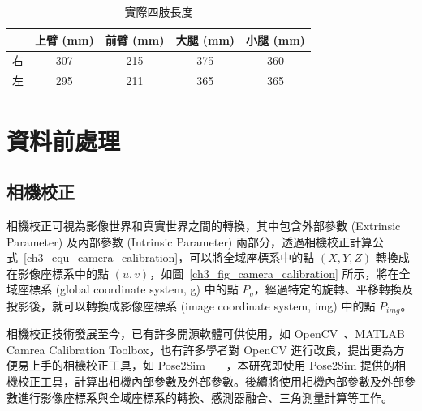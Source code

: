\begin{table}[!ht]
   \caption[實際四肢長度]{實際四肢長度}
   \centering
   \label{ch3_limb_length}
   \setlength{\tabcolsep}{3pt}
   \renewcommand\arraystretch{1.5}
   \begin{tabular}{c|c|c|c|c}
      \toprule
       & 上臂 (mm) & 前臂 (mm) & 大腿 (mm) & 小腿 (mm) \\ 
      \midrule[2pt]
      右 & 307 & 215 & 375 & 360 \\
      左 & 295 & 211 & 365 & 365 \\
      \bottomrule
   \end{tabular}
\end{table}

\section{資料前處理}

\subsection{相機校正}
相機校正可視為影像世界和真實世界之間的轉換，其中包含外部參數 (Extrinsic Parameter) 及內部參數 (Intrinsic Parameter) 兩部分，透過相機校正計算公式~\ref{ch3_equ_camera_calibration}，可以將全域座標系中的點 $(X, Y, Z)$ 轉換成在影像座標系中的點 $(u, v)$，如圖~\ref{ch3_fig_camera_calibration} 所示，將在全域座標系 (global coordinate system, g) 中的點 $P_g$，經過特定的旋轉、平移轉換及投影後，就可以轉換成影像座標系 (image coordinate system, img) 中的點 $P_{img}$。

相機校正技術發展至今，已有許多開源軟體可供使用，如 OpenCV~\cite{opencv_library}、MATLAB Camrea Calibration Toolbox，也有許多學者對 OpenCV 進行改良，提出更為方便易上手的相機校正工具，如 Pose2Sim ~\cite{Pagnon_2022_JOSS}~\cite{Pagnon_2021_Robustness}~\cite{Pagnon_2022_Accuracy}，本研究即使用 Pose2Sim 提供的相機校正工具，計算出相機內部參數及外部參數。後續將使用相機內部參數及外部參數進行影像座標系與全域座標系的轉換、感測器融合、三角測量計算等工作。

